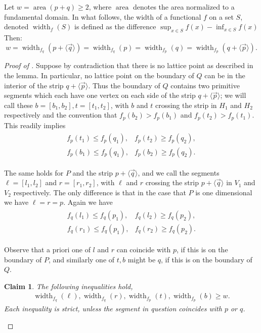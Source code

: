 \documentclass{amsart}
\theoremstyle{plain}
\newtheorem{claim}[theorem]{Claim}
\theoremstyle{definition}
\newcommand{\width}{\operatorname{width}}
\newcommand{\area}{\operatorname{area}}
\renewcommand{\vec}[1]{\overrightarrow#1}
\newcommand{\vecline}[1]{\langle \vec #1 \rangle}
\begin{document}
Let $w=\area(p+q) \geq 2$, where $\area$ denotes the area normalized to a fundamental domain. In what follows, the width of a functional $f$ on a set $S$, denoted $\width_f(S)$ is defined as the difference $\sup_{x\in S} f(x)-\inf_{x\in S} f(x)$
Then:
\[
w=\width_{f_q}(p + \vecline q )=\width_{f_q}(p)=\width_{f_p}(q)=\width_{f_p}(q +\vecline p ). 
\] 


\begin{proof}[Proof of ]
Suppose by contradiction that there is no lattice point as described in the lemma. In particular, no lattice point on the boundary of $Q$ can be in the interior of the strip $q + \vecline p$.  Thus the boundary of $Q$ contains two primitive segments which each have one vertex on each side of the strip $q + \vecline p$; we will call these  $b=[b_1, b_2], t=[t_1, t_2]$, with $b$ and $t$ crossing the strip in $H_1$ and $H_2$ respectively and the convention that $f_p(b_2) >f_p(b_1)$ and $f_p(t_2) >f_p(t_1)$. This readily implies 
\begin{gather}
\label{eq:widthq}
\begin{array}{cc}
f_p(t_1) \leq f_p(q_1), &
f_p(t_2) \geq f_p(q_2), \\
f_p(b_1) \leq f_p(q_1), &
f_p(b_2) \geq f_p(q_2).
\end{array}
\end{gather}


The same holds for $P$ and the strip $p+\vecline q$, and we call the segments $\ell=[l_1, l_2]$ and $r=[r_1, r_2]$, with $\ell$ and $r$ crossing the strip $p + \vecline q$  in $V_1$ and $ V_2$ respectively. The only difference is that in the case that $P$ is one dimensional we have $\ell=r=p$.  Again we have
\begin{gather}
\label{eq:widthp}
\begin{array}{cc}
f_q(l_1) \leq f_q(p_1), &
f_q(l_2) \geq f_q(p_2), \\
f_q(r_1) \leq f_q(p_1),&
f_q(r_2) \geq f_q(p_2).
\end{array}
\end{gather}

Observe that a priori one of $l$ and $r$ can coincide with $p$, if this is on the boundary of $P$, and similarly one of $t,b$ might be $q$, if this is on the boundary of $Q$. 


\begin{claim}
The following inequalities hold, 
\begin{align*}
\width_{f_q}(\ell) , 
\width_{f_q}(r) ,
\width_{f_p}(t) ,
\width_{f_p}(b) \geq w.
\end{align*}
Each inequality is strict, unless the segment in question coincides with $p$ or $q$.
\end{claim}


\end{proof}
\end{document}
